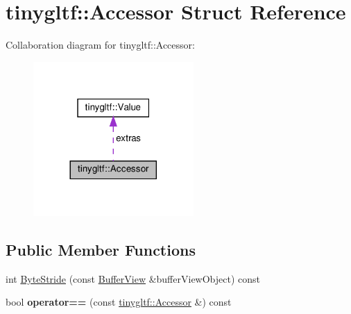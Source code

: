 \hypertarget{structtinygltf_1_1Accessor}{}\section{tinygltf\+:\+:Accessor Struct Reference}
\label{structtinygltf_1_1Accessor}


Collaboration diagram for tinygltf\+:\+:Accessor\+:\nopagebreak
\begin{figure}[H]
\begin{center}
\leavevmode
\includegraphics[width=173pt]{structtinygltf_1_1Accessor__coll__graph}
\end{center}
\end{figure}
\subsection*{Public Member Functions}
\begin{DoxyCompactItemize}
\item 
int \hyperlink{structtinygltf_1_1Accessor_a31262158214af822389c28f026bcb8a2}{Byte\+Stride} (const \hyperlink{structtinygltf_1_1BufferView}{Buffer\+View} \&buffer\+View\+Object) const
\item 
\mbox{\label{structtinygltf_1_1Accessor_a6c06c2afd4e8f8c45f09b4444d474fa5}} 
bool {\bfseries operator==} (const \hyperlink{structtinygltf_1_1Accessor}{tinygltf\+::\+Accessor} \&) const
\end{DoxyCompactItemize}
